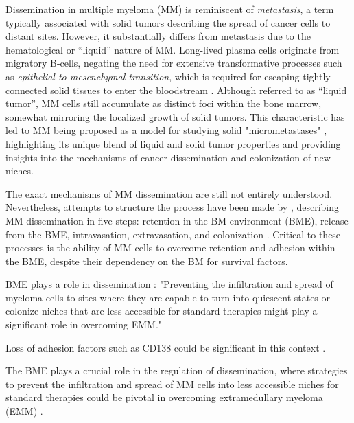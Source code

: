 Dissemination in multiple myeloma (MM) is reminiscent of \emph{metastasis}, a
term typically associated with solid tumors describing the spread of cancer
cells to distant sites. However, it substantially differs from metastasis due to
the hematological or ``liquid'' nature of MM. Long-lived plasma cells originate
from migratory B-cells, negating the need for extensive transformative processes
such as \emph{epithelial to mesenchymal transition}, which is required for
escaping tightly connected solid tissues to enter the bloodstream
\cite{ribattiEpithelialMesenchymalTransitionCancer2020}. Although referred to as
``liquid tumor'', MM cells still accumulate as distinct foci within the bone
marrow, somewhat mirroring the localized growth of solid tumors. This
characteristic has led to MM being proposed as a model for studying solid
"micrometastases" \cite{ghobrialMyelomaModelProcess2012}, highlighting its
unique blend of liquid and solid tumor properties and providing insights into
the mechanisms of cancer dissemination and colonization of new niches.





The exact mechanisms of MM dissemination are still not entirely understood.
Nevertheless, attempts to structure the process have been made by
\citet{zeissigTumourDisseminationMultiple2020}, describing MM dissemination in
five-steps: retention in the BM environment (BME), release from the BME,
intravasation, extravasation, and colonization
\cite{zeissigTumourDisseminationMultiple2020}. Critical to these processes is
the ability of MM cells to overcome retention and adhesion within the BME,
despite their dependency on the BM for survival factors. 

BME plays a role in dissemination \cite{forsterMolecularImpactTumor2022}:
"Preventing the infiltration and spread of myeloma cells to sites where they are
capable to turn into quiescent states or colonize niches that are less
accessible for standard therapies might play a significant role in overcoming
EMM."

Loss of adhesion
factors such as CD138 could be significant in this context
\cite{akhmetzyanovaDynamicCD138Surface2020,
brandlJunctionalAdhesionMolecule2022}. 

The BME plays a crucial role in the
regulation of dissemination, where strategies to prevent the infiltration and
spread of MM cells into less accessible niches for standard therapies could be
pivotal in overcoming extramedullary myeloma (EMM)
\cite{forsterMolecularImpactTumor2022}.

